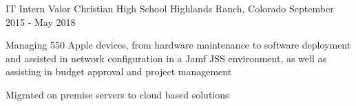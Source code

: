 \begin{cventries}

  \cventry
    {IT Intern}
    {Valor Christian High School }
    {Highlands Ranch, Colorado} %
    {September 2015 - May 2018} %
    {
      \begin{cvitems} %
        \item {Managing 550 Apple devices, from hardware maintenance
            to software deployment and assisted in network
            configuration in a Jamf JSS environment, as well as
            assisting in budget approval and project management}
        \item {Migrated on premise servers to cloud based solutions}
      \end{cvitems}
    }
\end{cventries}

